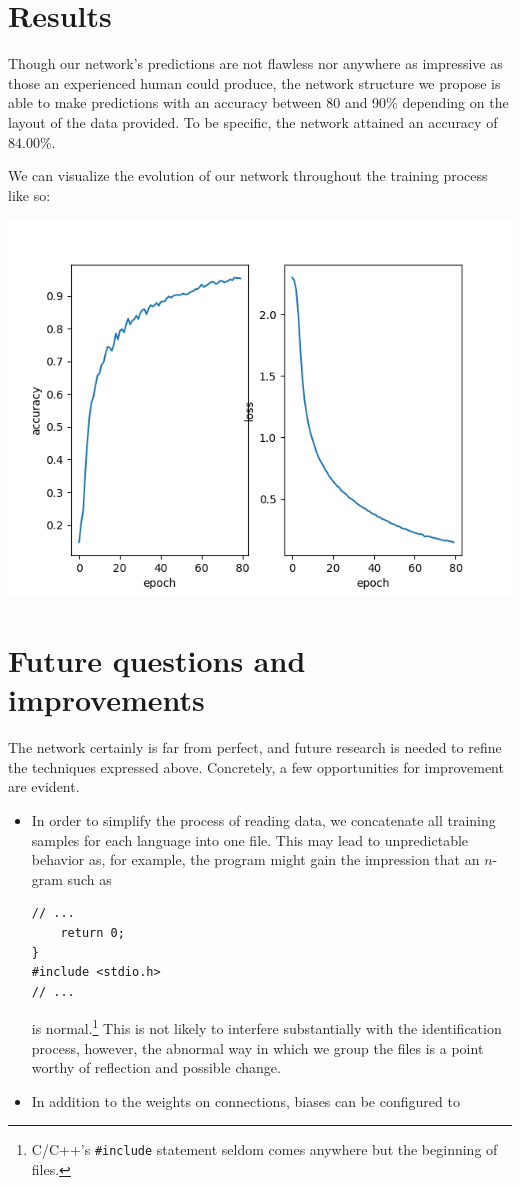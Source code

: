 \documentclass{article}
\begin{document}
\section{Results}
Though our network's predictions are not flawless nor anywhere as impressive as those an experienced human could produce, the network structure we propose is able to make predictions with an accuracy between 80 and 90\% depending on the layout of the data provided. To be specific, the network attained an accuracy of 84.00\%.

We can visualize the evolution of our network throughout the training process like so:

\includegraphics{history}

\section{Future questions and improvements}
The network certainly is far from perfect, and future research is needed to refine the techniques expressed above. Concretely, a few opportunities for improvement are evident.
\begin{itemize}
  \item{In order to simplify the process of reading data, we concatenate all training samples for each language into one file. This may lead to unpredictable behavior as, for example, the program might gain the impression that an $n$-gram such as
  \begin{verbatim}
// ...
    return 0;
}
#include <stdio.h>
// ...
  \end{verbatim}
  is normal.\footnote{C/C++'s \texttt{\#include} statement seldom comes anywhere but the beginning of files.} This is not likely to interfere substantially with the identification process, however, the abnormal way in which we group the files is a point worthy of reflection and possible change.}
  \item{In addition to the weights on connections, biases can be configured to }

\end{itemize}
\end{document}

